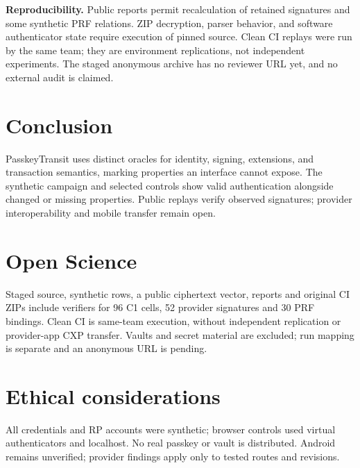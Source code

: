 \documentclass[letterpaper,twocolumn,10pt]{article}
\begin{document}
\textbf{Reproducibility.} Public reports permit recalculation of retained
signatures and some synthetic PRF relations. ZIP decryption, parser
behavior, and software authenticator state require execution of pinned
source. Clean CI replays were run by the same team; they are environment
replications, not independent experiments. The staged anonymous archive
has no reviewer URL yet, and no external audit is claimed.

\section{Conclusion}
PasskeyTransit uses distinct oracles for identity, signing, extensions,
and transaction semantics, marking properties an interface cannot expose.
The synthetic campaign and selected controls show valid authentication
alongside changed or missing properties. Public replays verify observed
signatures; provider interoperability and mobile transfer remain open.

\appendix
\section{Open Science}
Staged source, synthetic rows, a public ciphertext vector, reports and original CI ZIPs include
verifiers for 96 C1 cells, 52 provider signatures and 30 PRF bindings.
Clean CI is same-team execution, without independent replication or
provider-app CXP transfer. Vaults and secret material are excluded;
run mapping is separate and an anonymous URL is pending.

\section{Ethical considerations}
All credentials and RP accounts were synthetic; browser controls used
virtual authenticators and localhost. No real passkey or vault is
distributed. Android remains unverified; provider findings apply only
to tested routes and revisions.
\end{document}
